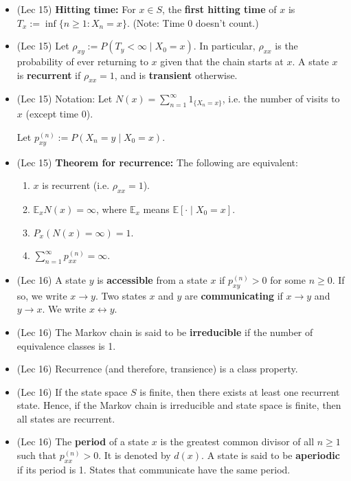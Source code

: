 \documentclass[twoside]{article}
\newcommand{\dis}{\displaystyle}
\newcommand\bbE{\mathbb{E}}
\begin{document}
\begin{itemize}
\item (Lec 15) \textbf{Hitting time:} For $x \in S$, the \textbf{first hitting time} of $x$ is $T_x := \inf \{ n \geq 1: X_n = x \}$. (Note: Time 0 doesn't count.)

\item (Lec 15) Let $\rho_{xy} := P(T_y < \infty \mid X_0 = x)$. In particular, $\rho_{xx}$ is the probability of ever returning to $x$ given that the chain starts at $x$. A state $x$ is \textbf{recurrent} if $\rho_{xx} = 1$, and is \textbf{transient} otherwise.

\item (Lec 15) Notation: Let $N(x) = \displaystyle\sum_{n=1}^\infty 1_{\{ X_n = x \}}$, i.e. the number of visits to $x$ (except time 0).

Let $p_{xy}^{(n)} := P(X_n = y \mid X_0 = x)$.

\item (Lec 15) \textbf{Theorem for recurrence:}  The following are equivalent:
\begin{enumerate}[label=(\alph*)]
\item $x$ is recurrent (i.e. $\rho_{xx} = 1$).
\item $\bbE_x N(x) = \infty$, where $\bbE_x$ means $\bbE [\cdot \mid X_0 = x]$.
\item $P_x( N(x) = \infty) = 1$.
\item $\dis\sum_{n=1}^\infty p_{xx}^{(n)} = \infty$.
\end{enumerate}

\item (Lec 16) A state $y$ is \textbf{accessible} from a state $x$ if $p_{xy}^{(n)} > 0$ for some $n \geq 0$. If so, we write $x \rightarrow y$. Two states $x$ and $y$ are \textbf{communicating} if $x \rightarrow y$ and $y \rightarrow x$. We write $x \leftrightarrow y$.

\item (Lec 16) The Markov chain is said to be \textbf{irreducible} if the number of equivalence classes is 1.

\item (Lec 16) Recurrence (and therefore, transience) is a class property.

\item (Lec 16) If the state space $S$ is finite, then there exists at least one recurrent state. Hence, if the Markov chain is irreducible and state space is finite, then all states are recurrent.

\item (Lec 16) The \textbf{period} of a state $x$ is the greatest common divisor of all $n \geq 1$ such that $p_{xx}^{(n)} > 0$. It is denoted by $d(x)$. A state is said to be \textbf{aperiodic} if its period is 1. States that communicate have the same period.


\end{itemize}
\end{document}
